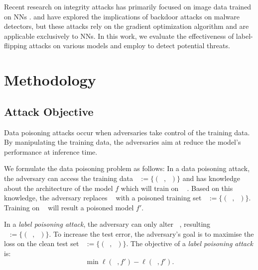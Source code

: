 \documentclass[runningheads]{llncs}
\DeclareMathOperator*{\Xtr}{\mathcal{X}_\text{train}}
\DeclareMathOperator*{\ytr}{\mathcal{Y}_\text{train}}
\DeclareMathOperator*{\Xte}{\mathcal{X}_\text{test}}
\DeclareMathOperator*{\yte}{\mathcal{Y}_\text{test}}
\DeclareMathOperator*{\Xpo}{\mathcal{X}^\prime_\text{train}}
\DeclareMathOperator*{\ypo}{\mathcal{Y}^\prime_\text{train}}
\DeclareMathOperator*{\Dpo}{\mathcal{D}^\prime_\text{train}}
\DeclareMathOperator*{\Dtr}{\mathcal{D}_\text{train}}
\DeclareMathOperator*{\Dte}{\mathcal{D}_\text{test}}
\begin{document}
Recent research on integrity attacks has primarily focused on image data trained on NNs \cite{aryal2022analysis}. 
\cite{sasaki2019embedding} and \cite{li2021backdoor} have explored the implications of backdoor attacks on malware detectors, but these attacks rely on the gradient optimization algorithm and are applicable exclusively to NNs. 
In this work, we evaluate the effectiveness of label-flipping attacks on various models and employ \diva to detect potential threats.

\section{Methodology}
\label{sec:methodology}

\subsection{Attack Objective}
\label{sec:method:objective}

Data poisoning attacks occur when adversaries take control of the training data.
By manipulating the training data, the adversaries aim at reduce the model's performance at inference time.

We formulate the data poisoning problem as follows:
In a data poisoning attack, the adversary can access the training data $\Dtr:=\{(\Xtr, \ytr)\}$ and has knowledge about the architecture of the model $f$ which will train on $\Dtr$ \cite{cina2022wild}. 
Based on this knowledge, the adversary replaces $\Dtr$ with a poisoned training set $\Dpo:=\{(\Xpo, \ypo)\}$.
Training on $\Dpo$ will result a poisoned model $f'$.

In a \emph{label poisoning attack}, the adversary can only alter $\ytr$, resulting $\Dpo:=\{(\Xtr, \ypo)\}$.
To increase the test error, the adversary's goal is to maximise the loss on the clean test set $\Dte:=\{(\Xte, \yte)\}$.
The objective of a \emph{label poisoning attack} \cite{munoz2017towards} is:
\begin{equation}
    \min_{\Dpo} \ell(\Dpo, f') - \ell(\Dte, f').
    \label{eq1}
\end{equation}
\end{document}
